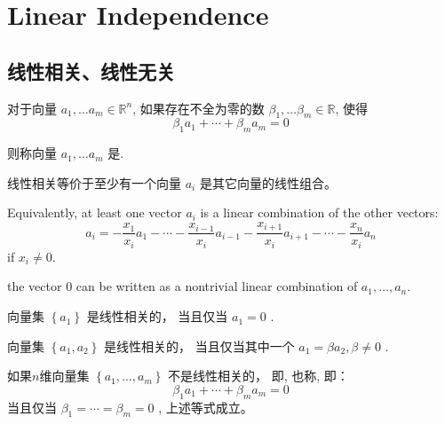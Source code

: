 \chapter{Linear Independence}

\section{线性相关、线性无关}

\begin{definition}
    对于向量 $ a_{1}, \ldots a_{m} \in \mathbb{R}^{n} $, 如果存在不全为零的数 $ \beta_{1}, \ldots \beta_{m} \in \mathbb{R} $, 使得
\begin{equation}
\beta_{1} a_{1}+\cdots+\beta_{m} a_{m}=0
\end{equation}

则称向量 $ a_{1}, \ldots a_{m} $ 是. 
\end{definition}

\begin{corollary}
    线性相关等价于至少有一个向量 $ a_{i} $ 是其它向量的线性组合。 

    Equivalently, at least one vector $ a_{i} $ is a linear combination of the other vectors:
\begin{equation}
a_{i}=-\frac{x_{1}}{x_{i}} a_{1}-\cdots-\frac{x_{i-1}}{x_{i}} a_{i-1}-\frac{x_{i+1}}{x_{i}} a_{i+1}-\cdots-\frac{x_{n}}{x_{i}} a_{n}
\end{equation}
if $ x_{i} \neq 0 $.
\end{corollary}


\begin{corollary}
    the vector $0$ can be written as a nontrivial linear combination of $ a_{1}, \ldots, a_{n} $.
\end{corollary}


\begin{corollary}
    向量集 $ \left\{a_{1}\right\} $ 是线性相关的， 当且仅当 $ a_{1}=0 $ . 
\end{corollary}
\begin{corollary}
    向量集 $ \left\{a_{1}, a_{2}\right\} $ 是线性相关的，  当且仅当其中一个 $ a_{1}=\beta a_{2}, \beta \neq 0 $ . 
\end{corollary}

\begin{definition}
    \label{Def:LinearIndependence}
    如果$n$维向量集 $ \left\{a_{1}, \ldots, a_{m}\right\} $ 不是线性相关的， 即, 也称,  即：
\begin{equation}
\beta_{1} a_{1}+\cdots+\beta_{m} a_{m}=0
\end{equation}
当且仅当 $ \beta_{1}=\cdots=\beta_{m}=0 $ , 上述等式成立。 
\end{definition}


